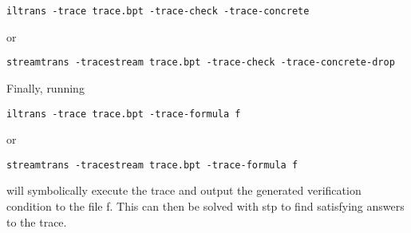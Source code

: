 \begin{verbatim}
iltrans -trace trace.bpt -trace-check -trace-concrete
\end{verbatim}
or
\begin{verbatim}
streamtrans -tracestream trace.bpt -trace-check -trace-concrete-drop
\end{verbatim}


Finally, running
%
\begin{verbatim}
iltrans -trace trace.bpt -trace-formula f
\end{verbatim}
or
\begin{verbatim}
streamtrans -tracestream trace.bpt -trace-formula f
\end{verbatim}

will symbolically execute the trace and output the generated verification
condition to the file f. This can then be solved with stp to find satisfying
answers to the trace.

